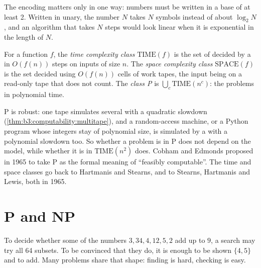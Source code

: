 The encoding matters only in one way: numbers must be written in a base of at least 2. Written in unary, the number $N$ takes $N$ symbols instead of about $\log_2 N$, and an algorithm that takes $N$ steps would look linear when it is exponential in the length of $N$.

\begin{definition}\label{def:b3:complexity-classes:classes}
For a function $f$, the \emph{time complexity class} $\mathrm{TIME}(f)$ is the set of  decided by a  in $O(f(n))$ steps on inputs of size $n$. The \emph{space complexity class} $\mathrm{SPACE}(f)$ is the set decided using $O(f(n))$ cells of work tapes, the input being on a read-only tape that does not count. The \emph{class P} is $\bigcup_c \mathrm{TIME}(n^c)$: the problems  in polynomial time.
\end{definition}

P is robust: one tape simulates several with a quadratic slowdown (\cref{thm:b3:computability:multitape}), and a random-access machine, or a Python program whose integers stay of polynomial size, is simulated by a  with a polynomial slowdown too. So whether a problem is in P does not depend on the model, while whether it is in $\mathrm{TIME}(n^2)$ does. Cobham and Edmonds proposed in 1965 to take P as the formal meaning of ``feasibly computable''. %
The time and space classes go back to Hartmanis and Stearns, and to Stearns, Hartmanis and Lewis, both in 1965. %

\section{P and NP}\label{sec:b3:complexity-classes:np}

To decide whether some of the numbers $3, 34, 4, 12, 5, 2$ add up to $9$, a search may try all 64 subsets. To be convinced that they do, it is enough to be shown $\{4, 5\}$ and to add. Many problems share that shape: finding is hard, checking is easy.

